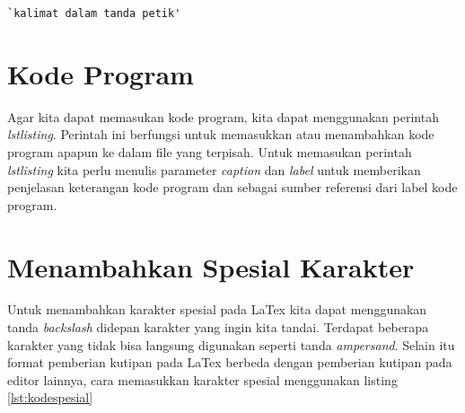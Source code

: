\begin{lstlisting}[caption=Contoh kalimat dalam tanda petik pada Latex,label={lst:tandapetik}]
`kalimat dalam tanda petik'
\end{lstlisting}


\section{Kode Program}
Agar kita dapat memasukan kode program, kita dapat menggunakan perintah \textit{lstlisting}. Perintah ini  berfungsi untuk memasukkan atau menambahkan kode program apapun ke dalam file yang terpisah. Untuk memasukan perintah \textit{lstlisting} kita perlu menulis parameter \textit{caption} dan \textit{label} untuk memberikan penjelasan keterangan kode program dan sebagai sumber referensi dari label kode program.




\section{Menambahkan Spesial Karakter}
Untuk menambahkan karakter spesial pada LaTex kita dapat menggunakan tanda \textit{backslash} didepan karakter yang ingin kita tandai. Terdapat beberapa karakter yang tidak bisa langsung digunakan seperti tanda \textit{ampersand}. Selain itu format pemberian kutipan pada LaTex berbeda dengan pemberian kutipan pada editor lainnya, cara memasukkan karakter spesial menggunakan listing \ref{lst:kodespesial}



